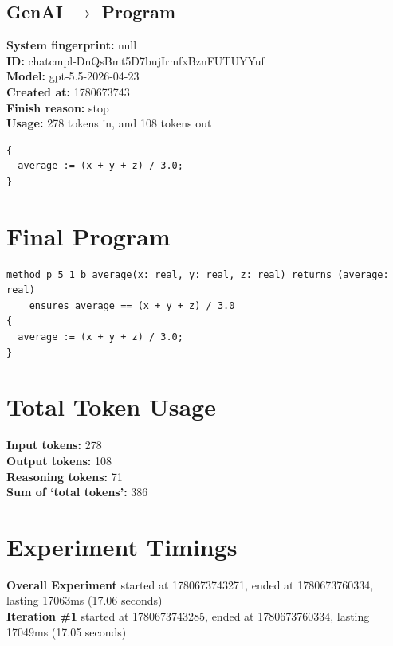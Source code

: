 \documentclass{article}
\begin{document}
\subsection*{GenAI $\rightarrow$ Program}
\textbf{System fingerprint: }null
\\\textbf{ID: }chatcmpl-DnQsBmt5D7bujIrmfxBznFUTUYYuf
\\\textbf{Model: }gpt-5.5-2026-04-23
\\\textbf{Created at: }1780673743
\\\textbf{Finish reason: }stop
\\\textbf{Usage: }278 tokens in, and 108 tokens out
\begin{lstlisting}
{
  average := (x + y + z) / 3.0;
}
\end{lstlisting}
\section*{Final Program}
\begin{lstlisting}
method p_5_1_b_average(x: real, y: real, z: real) returns (average: real)
	ensures average == (x + y + z) / 3.0
{
  average := (x + y + z) / 3.0;
}
\end{lstlisting}
\section*{Total Token Usage}
\textbf{Input tokens: }278
\\\textbf{Output tokens: }108
\\\textbf{Reasoning tokens: }71
\\\textbf{Sum of `total tokens': }386
\section*{Experiment Timings}
\textbf{Overall Experiment} started at 1780673743271, ended at 1780673760334, lasting 17063ms (17.06 seconds)
\\\textbf{Iteration \#1} started at 1780673743285, ended at 1780673760334, lasting 17049ms (17.05 seconds)
\end{document}
